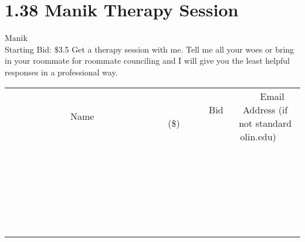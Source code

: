\documentclass[11pt]{article}
\begin{document}
\section*{1.38 Manik Therapy Session}
Manik
\\
Starting Bid: \$3.5
\newline
Get a therapy session with me. Tell me all your woes or bring in your roommate for roommate counciling and I will give you the least helpful responses in a professional way.
\\[6ex]
\begin{tabular}{c c c}
~~~~~~~~~~~~~Name~~~~~~~~~~~~~ & ~~~~~~~~~Bid (\$)~~~~~~~~~  & ~~~Email Address (if not standard olin.edu)~~~\\
 & & \\
\hline
 & & \\
\hline
 & & \\
\hline
 & & \\
\hline
 & & \\
\hline
 & & \\
\hline
 & & \\
\hline
 & & \\
\hline
 & & \\
\hline
 & & \\
\hline
 & & \\
\hline
 & & \\
\hline
 & & \\
\hline
 & & \\
\hline
 & & \\
\hline
 & & \\
\hline
 & & \\
\hline
 & & \\
\hline
 & & \\
\hline
 & & \\
\hline
 & & \\
\hline
 & & \\
\hline
 & & \\
\hline
 & & \\
\hline
 & & \\
\hline
 & & \\
\hline
\end{tabular}
\newpage
\end{document}
